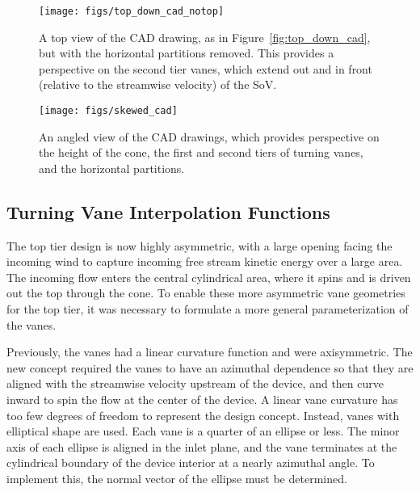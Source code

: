 \begin{figure}[!htb]
  \begin{center}
   \texttt{[image: figs/top\_down\_cad\_notop]}
   \caption{A top view of the CAD drawing, as in
   Figure~\ref{fig:top_down_cad}, but with the horizontal partitions
   removed. This provides a perspective on the second tier vanes, which
   extend out and in front (relative to the streamwise velocity) of the
   SoV.}
   \label{fig:top_down_cad_notop}
  \end{center}
 \end{figure}

\begin{figure}[!htb]
  \begin{center}
   \texttt{[image: figs/skewed\_cad]}
   \caption{An angled view of the CAD drawings, which provides
   perspective on the height of the cone, the first and second tiers of 
   turning vanes, and the horizontal partitions.}
   \label{fig:cad_skewed}
  \end{center}
 \end{figure}

\subsection{Turning Vane Interpolation Functions}
\label{sec:interpolate}

The top tier design is now highly asymmetric, with a
large opening facing the incoming wind to capture incoming free stream
kinetic energy over a large area. The incoming flow enters the central
cylindrical area, where it spins and is driven out the top through the
cone. To enable these more asymmetric vane geometries for the top tier,
it was necessary to formulate a more general parameterization of the
vanes.

Previously, the vanes had a linear curvature function and were
axisymmetric. The new concept required the vanes to have an azimuthal
dependence so that they are aligned with the streamwise velocity upstream 
of the device, and then curve inward to spin the flow at the center of
the device. A linear vane curvature has
too few degrees of freedom to represent the design concept. 
Instead, vanes with elliptical shape are used. Each vane is a quarter of 
an ellipse or less. The minor axis of each ellipse is aligned in the inlet 
plane, and the vane terminates at the cylindrical boundary of the device interior 
at a nearly azimuthal angle. To implement this, the normal vector of the ellipse 
must be determined. 

